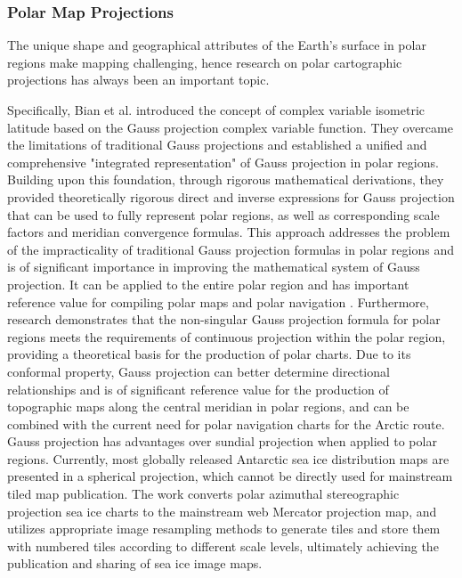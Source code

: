 \subsubsection{Polar Map Projections } 

The unique shape and geographical attributes of the Earth's surface in polar regions make mapping challenging, hence research on polar cartographic projections has always been an important topic.

Specifically, Bian et al. \cite{187shaofeng2014non} introduced the concept of complex variable isometric latitude based on the Gauss projection complex variable function. They overcame the limitations of traditional Gauss projections and established a unified and comprehensive "integrated representation" of Gauss projection in polar regions. Building upon this foundation, through rigorous mathematical derivations, they provided theoretically rigorous direct and inverse expressions for Gauss projection that can be used to fully represent polar regions, as well as corresponding scale factors and meridian convergence formulas. This approach addresses the problem of the impracticality of traditional Gauss projection formulas in polar regions and is of significant importance in improving the mathematical system of Gauss projection. It can be applied to the entire polar region and has important reference value for compiling polar maps and polar navigation \cite{188zhongmei2017forward}. Furthermore, research \cite{191zhang2015comparisons} demonstrates that the non-singular Gauss projection formula for polar regions meets the requirements of continuous projection within the polar region, providing a theoretical basis for the production of polar charts. Due to its conformal property, Gauss projection can better determine directional relationships and is of significant reference value for the production of topographic maps along the central meridian in polar regions, and can be combined with the current need for polar navigation charts for the Arctic route. Gauss projection has advantages over sundial projection when applied to polar regions. Currently, most globally released Antarctic sea ice distribution maps are presented in a spherical projection, which cannot be directly used for mainstream tiled map publication. The work \cite{192lu2012application} converts polar azimuthal stereographic projection sea ice charts to the mainstream web Mercator projection map, and utilizes appropriate image resampling methods to generate tiles and store them with numbered tiles according to different scale levels, ultimately achieving the publication and sharing of sea ice image maps.

